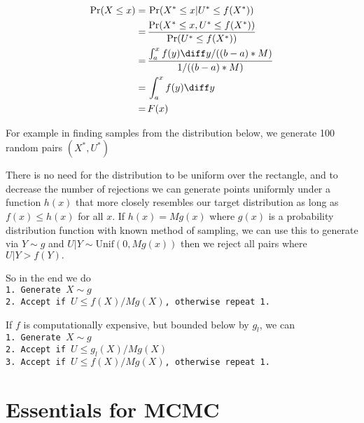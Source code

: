 \begin{align*}
    \Pr(X \leq x) =\,& \Pr(X^* \leq x|U^*\leq f(X^*))\\
    =\,& \frac{\Pr(X^* \leq x, U^*\leq f(X^*))}{\Pr(U^*\leq f(X^*))}\\
    =\,& \frac{\int_a^xf(y)\diff y/((b - a)*M)}{1/((b - a)*M)}\\
    =\,& \int_a^xf(y)\diff y\\
    =\,& F(x)
\end{align*}

For example in finding samples from the distribution below, we generate 100 random pairs $(X^*, U^*)$



There is no need for the distribution to be uniform over the rectangle, and to decrease the number of rejections we can generate points uniformly under a function $h(x)$ that more closely resembles our target distribution as long as $f(x)\leq h(x)$ for all $x$. If $h(x) = Mg(x)$ where $g(x)$ is a probability distribution function with known method of sampling, we can use this to generate via $Y\sim g$ and $U|Y\sim \mathrm{Unif}(0, Mg(x))$ then we reject all pairs where $U|Y>f(Y).$

So in the end we do\texttt{\\
1. Generate $X\sim g$\\
2. Accept if $U\leq f(X)/Mg(X)$, otherwise repeat 1.}

If $f$ is computationally expensive, but bounded below by $g_l$, we can \texttt{\\
1. Generate $X\sim g$\\
2. Accept if $U\leq g_l(X)/Mg(X)$\\
3. Accept if $U\leq f(X)/Mg(X)$, otherwise repeat 1.}

\section{Essentials for MCMC}\label{Markov_chains}

